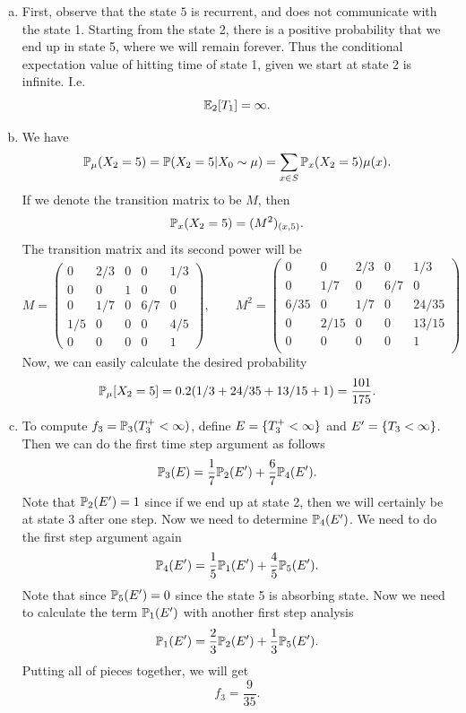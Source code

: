 \begin{solution}
	\begin{enumerate}[(a)]
		\item First, observe that the state $5$ is recurrent, and does not communicate with the state 1. Starting from the state 2, there is a positive probability that we end up in state 5, where we will remain forever. Thus the conditional expectation value of hitting time of state 1, given we start at state 2 is infinite. I.e.
		\[ \mathbb{E}_2[T_1] = \infty. \]
		\item We have
		\[ \mathbb{P}_\mu(X_2 = 5) = \mathbb{P}(X_2 = 5|X_0 \sim \mu) = \sum_{x\in S}\mathbb{P}_x(X_2=5)\mu(x). \]
		If we denote the transition matrix to be $M$, then
		\[ \mathbb{P}_x(X_2=5) = (M^2)_{(x,5)}. \]
		The transition matrix and its second power will be
		\[ 
		M = \begin{pmatrix}
			0 & 2/3 & 0 & 0 & 1/3 \\
			0 & 0 & 1 & 0 & 0 \\
			0 & 1/7 & 0 & 6/7 & 0 \\
			1/5 & 0 & 0 & 0 & 4/5 \\
			0 & 0 & 0 & 0 & 1
		\end{pmatrix}, \qquad
		M^2 = \begin{pmatrix}
			0 & 0 & 2/3 & 0 & 1/3 \\
			0 & 1/7 & 0 & 6/7 & 0 \\
			6/35 & 0 & 1/7 & 0 & 24/35 \\
			0 & 2/15 & 0 & 0 & 13/15 \\
			0 & 0 & 0 & 0 & 1 \\
		\end{pmatrix}
		\]
		Now, we can easily calculate the desired probability
		\[ \mathbb{P}_\mu[X_2 = 5] = 0.2 (1/3 + 24/35 + 13/15 + 1) = \frac{101}{175}. \]
		
		\item To compute $f_3 = \mathbb{P}_3(T^+_3 < \infty)$, define $E = \{T^+_3<\infty\}$ and $E'=\{T_3 < \infty\}$. Then we can do the first time step argument as follows
		\[ \mathbb{P}_3(E) = \frac{1}{7}\mathbb{P}_2(E') + \frac{6}{7}\mathbb{P}_4(E'). \]
		Note that $\mathbb{P}_2(E') = 1$ since if we end up at state 2, then we will certainly be at state 3 after one step. Now we need to determine $\mathbb{P}_4(E')$. We need to do the first step argument again
		\[ \mathbb{P}_4(E') = \frac{1}{5}\mathbb{P}_1(E') + \frac{4}{5}\mathbb{P}_5(E'). \]
		Note that since $\mathbb{P}_5(E') =0$ since the state 5 is absorbing state. Now we need to calculate the term $\mathbb{P}_1(E')$ with another first step analysis
		\[ \mathbb{P}_1(E') = \frac{2}{3}\mathbb{P}_2(E') + \frac{1}{3} \mathbb{P}_5(E'). \]
		Putting all of pieces together, we will get
		\[\boxed{ f_3 = \frac{9}{35} }.\]
	\end{enumerate}
\end{solution}


